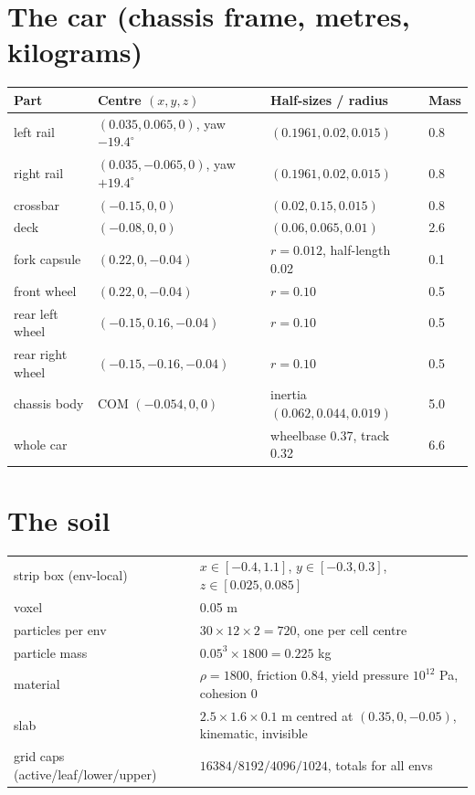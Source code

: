 \section*{The car (chassis frame, metres, kilograms)}
\begin{center}
\small
\begin{tabular}{@{}llll@{}}
\toprule
Part & Centre $(x,y,z)$ & Half-sizes / radius & Mass \\
\midrule
left rail & $(0.035, 0.065, 0)$, yaw $-19.4^\circ$ & $(0.1961, 0.02, 0.015)$ & 0.8 \\
right rail & $(0.035, -0.065, 0)$, yaw $+19.4^\circ$ & $(0.1961, 0.02, 0.015)$ & 0.8 \\
crossbar & $(-0.15, 0, 0)$ & $(0.02, 0.15, 0.015)$ & 0.8 \\
deck & $(-0.08, 0, 0)$ & $(0.06, 0.065, 0.01)$ & 2.6 \\
fork capsule & $(0.22, 0, -0.04)$ & $r=0.012$, half-length 0.02 & 0.1 \\
front wheel & $(0.22, 0, -0.04)$ & $r=0.10$ & 0.5 \\
rear left wheel & $(-0.15, 0.16, -0.04)$ & $r=0.10$ & 0.5 \\
rear right wheel & $(-0.15, -0.16, -0.04)$ & $r=0.10$ & 0.5 \\
\midrule
chassis body & COM $(-0.054, 0, 0)$ & inertia $(0.062, 0.044, 0.019)$ & 5.0 \\
whole car & & wheelbase 0.37, track 0.32 & 6.6 \\
\bottomrule
\end{tabular}
\end{center}

\section*{The soil}
\begin{center}
\small
\begin{tabular}{@{}ll@{}}
\toprule
strip box (env-local) & $x\in[-0.4, 1.1]$, $y\in[-0.3, 0.3]$, $z\in[0.025, 0.085]$ \\
voxel & 0.05 m \\
particles per env & $30\times12\times2 = 720$, one per cell centre \\
particle mass & $0.05^3\times1800 = 0.225$ kg \\
material & $\rho=1800$, friction $0.84$, yield pressure $10^{12}$ Pa, cohesion 0 \\
slab & $2.5\times1.6\times0.1$ m centred at $(0.35, 0, -0.05)$, kinematic, invisible \\
grid caps (active/leaf/lower/upper) & $16384 / 8192 / 4096 / 1024$, totals for all envs \\
\bottomrule
\end{tabular}
\end{center}

